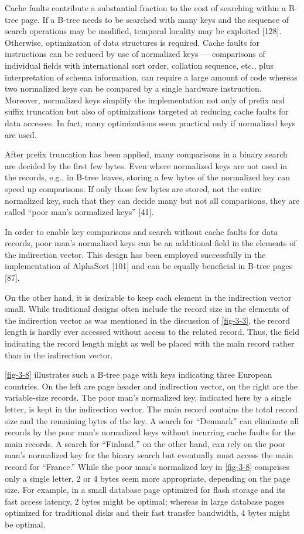 Cache faults contribute a substantial fraction to the cost of searching
within a B-tree page. If a B-tree needs to be searched with many keys
and the sequence of search operations may be modified, temporal locality
may be exploited {[}128{]}. Otherwise, optimization of data structures
is required. Cache faults for instructions can be reduced by use of
normalized keys --- comparisons of individual fields with international
sort order, collation sequence, etc., plus interpretation of schema
information, can require a large amount of code whereas two normalized
keys can be compared by a single hardware instruction. Moreover,
normalized keys simplify the implementation not only of prefix and
suffix truncation but also of optimizations targeted at reducing cache
faults for data accesses. In fact, many optimizations seem practical
only if normalized keys are used.

After prefix truncation has been applied, many comparisons in a binary
search are decided by the first few bytes. Even where normalized keys
are not used in the records, e.g., in B-tree leaves, storing a few bytes
of the normalized key can speed up comparisons. If only those few bytes
are stored, not the entire normalized key, such that they can decide
many but not all comparisons, they are called ``poor man's normalized
keys'' {[}41{]}.

In order to enable key comparisons and search without cache faults for
data records, poor man's normalized keys can be an additional field in
the elements of the indirection vector. This design has been employed
successfully in the implementation of AlphaSort {[}101{]} and can be
equally beneficial in B-tree pages {[}87{]}.

On the other hand, it is desirable to keep each element in the
indirection vector small. While traditional designs often include the
record size in the elements of the indirection vector as was mentioned
in the discussion of \autoref{fig-3-3}, the record length is hardly ever
accessed without access to the related record. Thus, the field
indicating the record length might as well be placed with the main
record rather than in the indirection vector.

\autoref{fig-3-8} illustrates such a B-tree page with keys indicating three
European countries. On the left are page header and indirection vector,
on the right are the variable-size records. The poor man's normalized
key, indicated here by a single letter, is kept in the indirection
vector. The main record contains the total record size and the remaining
bytes of the key. A search for ``Denmark'' can eliminate all records by
the poor man's normalized keys without incurring cache faults for the
main records. A search for ``Finland,'' on the other hand, can rely on
the poor man's normalized key for the binary search but eventually must
access the main record for ``France.'' While the poor man's normalized
key in \autoref{fig-3-8} comprises only a single letter, 2 or 4 bytes seem more
appropriate, depending on the page size. For example, in a small
database page optimized for flash storage and its fast access latency, 2
bytes might be optimal; whereas in large database pages optimized for
traditional disks and their fast transfer bandwidth, 4 bytes might be
optimal.

